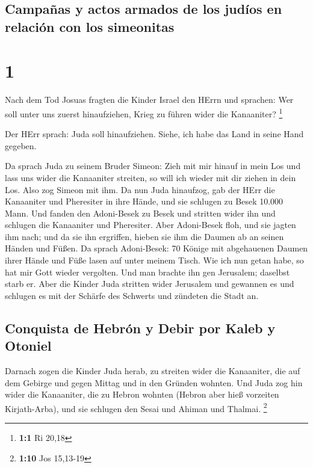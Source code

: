 \hypertarget{campauxf1as-y-actos-armados-de-los-juduxedos-en-relaciuxf3n-con-los-simeonitas}{%
\subsection{Campañas y actos armados de los judíos en relación con los
simeonitas}\label{campauxf1as-y-actos-armados-de-los-juduxedos-en-relaciuxf3n-con-los-simeonitas}}

\hypertarget{section}{%
\section{1}\label{section}}

 Nach dem Tod Josuas fragten die Kinder Israel den HErrn
und sprachen: Wer soll unter uns zuerst hinaufziehen, Krieg zu führen
wider die Kanaaniter? \footnote{\textbf{1:1} Ri 20,18}

 Der HErr sprach: Juda soll hinaufziehen. Siehe, ich habe
das Land in seine Hand gegeben.

 Da sprach Juda zu seinem Bruder Simeon: Zieh mit mir
hinauf in mein Los und lass uns wider die Kanaaniter streiten, so will
ich wieder mit dir ziehen in dein Los. Also zog Simeon mit ihm.
 Da nun Juda hinaufzog, gab der HErr die Kanaaniter und
Pheresiter in ihre Hände, und sie schlugen zu Besek 10.000 Mann.
 Und fanden den Adoni-Besek zu Besek und stritten wider
ihn und schlugen die Kanaaniter und Pheresiter.  Aber
Adoni-Besek floh, und sie jagten ihm nach; und da sie ihn ergriffen,
hieben sie ihm die Daumen ab an seinen Händen und Füßen. 
Da sprach Adoni-Besek: 70 Könige mit abgehauenen Daumen ihrer Hände und
Füße lasen auf unter meinem Tisch. Wie ich nun getan habe, so hat mir
Gott wieder vergolten. Und man brachte ihn gen Jerusalem; daselbst starb
er.  Aber die Kinder Juda stritten wider Jerusalem und
gewannen es und schlugen es mit der Schärfe des Schwerts und zündeten
die Stadt an.

\hypertarget{conquista-de-hebruxf3n-y-debir-por-kaleb-y-otoniel}{%
\subsection{Conquista de Hebrón y Debir por Kaleb y
Otoniel}\label{conquista-de-hebruxf3n-y-debir-por-kaleb-y-otoniel}}

 Darnach zogen die Kinder Juda herab, zu streiten wider
die Kanaaniter, die auf dem Gebirge und gegen Mittag und in den Gründen
wohnten.  Und Juda zog hin wider die Kanaaniter, die zu
Hebron wohnten (Hebron aber hieß vorzeiten Kirjath-Arba), und sie
schlugen den Sesai und Ahiman und Thalmai. \footnote{\textbf{1:10} Jos
  15,13-19}

